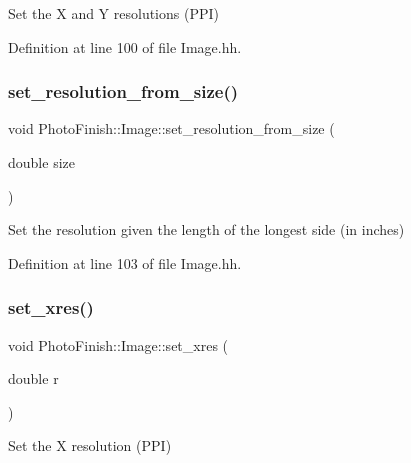 Set the X and Y resolutions (P\+PI) 



Definition at line 100 of file Image.\+hh.

\mbox{\label{class_photo_finish_1_1_image_a4775db7132f11396138ea6a35301e896}} 
\subsubsection{\texorpdfstring{set\+\_\+resolution\+\_\+from\+\_\+size()}{set\_resolution\_from\_size()}}
{\footnotesize\ttfamily void Photo\+Finish\+::\+Image\+::set\+\_\+resolution\+\_\+from\+\_\+size (\begin{DoxyParamCaption}\item[{double}]{size }\end{DoxyParamCaption})\hspace{0.3cm}{\ttfamily [inline]}}



Set the resolution given the length of the longest side (in inches) 



Definition at line 103 of file Image.\+hh.

\mbox{\label{class_photo_finish_1_1_image_a8e5edb65c6f92fee4ce7742e4ad61619}} 
\subsubsection{\texorpdfstring{set\+\_\+xres()}{set\_xres()}}
{\footnotesize\ttfamily void Photo\+Finish\+::\+Image\+::set\+\_\+xres (\begin{DoxyParamCaption}\item[{double}]{r }\end{DoxyParamCaption})\hspace{0.3cm}{\ttfamily [inline]}}



Set the X resolution (P\+PI) 



